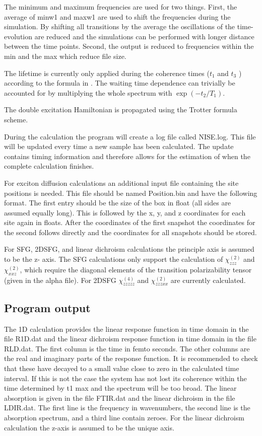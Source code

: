 The minimum and maximum frequencies are used for two things. First, the average of minw1 and maxw1 are used to shift the frequencies during the simulation. By shifting all transitions by the
average the oscillations of the time-evolution are reduced and the simulations can be performed with
longer distance between the time points. Second, the output is reduced to frequencies within the
min and the max which reduce file size.

The lifetime is currently only applied during the coherence times ($t_1$ and $t_3$ ) according 
to the formula in \cite{Liang.2012.JCTC.8.1706}. The waiting time dependence can trivially be accounted for by 
multiplying the whole spectrum with $\exp( -t_2 /T_1 )$.

The double excitation Hamiltonian is propagated using the Trotter formula scheme\cite{Paarmann.2008.JCP.128.191103,Jansen.2010.JCP.132.224503}.

During the calculation the program will create a log file called NISE.log. This file will be updated
every time a new sample has been calculated. The update contains timing information and
therefore allows for the estimation of when the complete calculation finishes.

For exciton diffusion calculations an additional input file containing the site positions is needed.
This file should be named Position.bin and have the following format. The first entry should be the
size of the box in float (all sides are assumed equally long). This is followed by the x, y, and z coordinates for each site again in floats. After the coordinates of the first snapshot the coordinates
for the second follows directly and the coordinates for all snapshots should be stored.

For SFG, 2DSFG, and linear dichroism calculations the principle axis is assumed to be the z- 
axis. The SFG calculations only support the calculation of $\chi^{(2)}_{zzz}$ and $\chi^{(2)}_{xxz}$, which require the diagonal elements of the transition polarizability tensor (given in the alpha file). For 2DSFG $\chi^{(4)}_{zzzzz}$ and $\chi^{(2)}_{zzzxx}$ are currently calculated.

\subsection{Program output}
The 1D calculation provides the linear response function in time domain in the file R1D.dat 
and the linear dichroism response function in time domain in the file RLD.dat. The first 
column is the time in femto seconds. The other columns are the real and imaginary parts 
of the response function. It is recommended to check that these have decayed to a small 
value close to zero in the calculated time interval. If this is not the case the system has 
not lost its coherence within the time determined by t1 max and the spectrum will be 
too broad. The linear absorption is given in the file FTIR.dat and the linear dichroism in 
the file LDIR.dat. The first line is the frequency in wavenumbers, the second line is the 
absorption spectrum, and a third line contain zeroes. For the linear dichroism calculation 
the z-axis is assumed to be the unique axis. 

